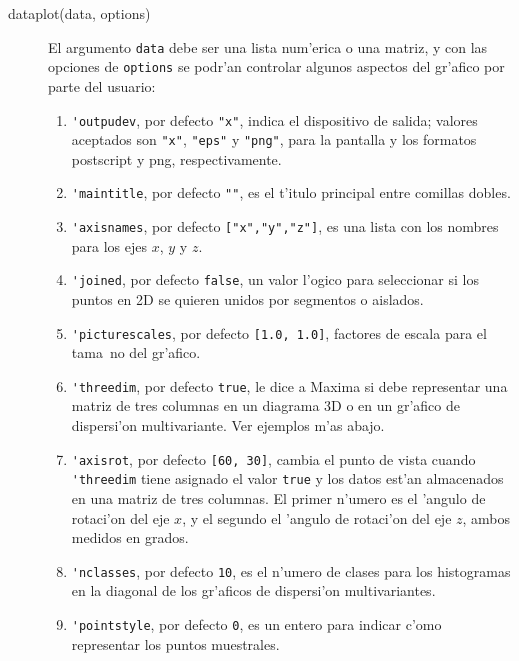\documentclass[spanish,12pt,a4paper]{article}
\begin{document}
\begin{description}

\item[dataplot(data, options)] El argumento \verb|data| debe ser una lista num'erica o una matriz, y con las opciones de \verb|options| se podr'an controlar algunos aspectos del gr'afico por parte del usuario:

\begin{enumerate}
\item \verb|'outpudev|, por defecto \verb|"x"|, indica el dispositivo de salida; valores aceptados son \verb|"x"|, \verb|"eps"| y \verb|"png"|, para la pantalla y los formatos postscript y png, respectivamente.
\item \verb|'maintitle|, por defecto \verb|""|, es el t'itulo principal entre comillas dobles.
\item \verb|'axisnames|, por defecto \verb|["x","y","z"]|, es una lista con los nombres para los ejes $x$, $y$ y $z$.
\item \verb|'joined|, por defecto \verb|false|, un valor l'ogico para seleccionar si los puntos en 2D se quieren unidos por segmentos o aislados.
\item \verb|'picturescales|, por defecto \verb|[1.0, 1.0]|, factores de escala para el tama~no del gr'afico.
\item \verb|'threedim|, por defecto \verb|true|, le dice a Maxima si debe representar una matriz de tres columnas en un diagrama 3D o en un gr'afico de dispersi'on multivariante. Ver ejemplos m'as abajo.
\item \verb|'axisrot|, por defecto \verb|[60, 30]|, cambia el punto de vista cuando \verb|'threedim| tiene asignado el valor \verb|true| y los datos est'an almacenados en una matriz de tres columnas. El primer n'umero es el 'angulo de rotaci'on del eje $x$, y el segundo el 'angulo de rotaci'on del eje $z$, ambos medidos en grados.
\item \verb|'nclasses|, por defecto \verb|10|, es el n'umero de clases para los histogramas en la diagonal de los gr'aficos de dispersi'on multivariantes.
\item \verb|'pointstyle|, por defecto \verb|0|, es un entero para indicar c'omo representar los puntos muestrales.
\end{enumerate}


\end{description}
\end{document}
